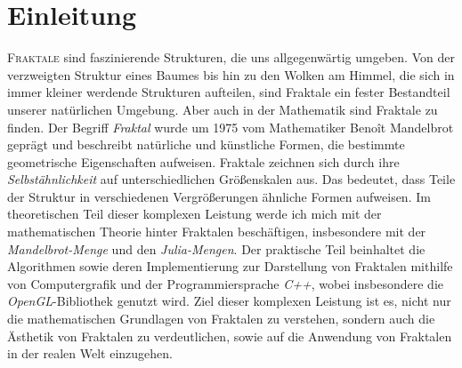 \chapter*{Einleitung}

%

\lettrine{F}{raktale} sind faszinierende Strukturen, die uns allgegenwärtig umgeben.
Von der verzweigten Struktur eines Baumes bis hin zu den Wolken am Himmel, die sich in immer kleiner werdende Strukturen aufteilen, sind Fraktale ein fester Bestandteil unserer natürlichen Umgebung.
Aber auch in der Mathematik sind Fraktale zu finden. \newline
Der Begriff \textit{Fraktal} wurde um 1975 vom Mathematiker Benoît Mandelbrot geprägt und beschreibt natürliche und künstliche Formen, die bestimmte geometrische Eigenschaften aufweisen. \newline
Fraktale zeichnen sich durch ihre \textit{Selbstähnlichkeit} auf unterschiedlichen Größenskalen aus. Das bedeutet, dass Teile der Struktur in verschiedenen Vergrößerungen ähnliche Formen aufweisen. \newline
\hfill \break
Im theoretischen Teil dieser komplexen Leistung werde ich mich mit der mathematischen Theorie hinter Fraktalen beschäftigen, insbesondere mit der \textit{Mandelbrot-Menge} und den \textit{Julia-Mengen}. \newline
Der praktische Teil beinhaltet die Algorithmen sowie deren Implementierung zur Darstellung von Fraktalen mithilfe von Computergrafik und der Programmiersprache \textit{C++}, wobei insbesondere die \textit{OpenGL}-Bibliothek genutzt wird. \newline
\hfill \break
Ziel dieser komplexen Leistung ist es, nicht nur die mathematischen Grundlagen von Fraktalen zu verstehen, sondern auch die Ästhetik von Fraktalen zu verdeutlichen, sowie auf die Anwendung von Fraktalen in der realen Welt einzugehen.